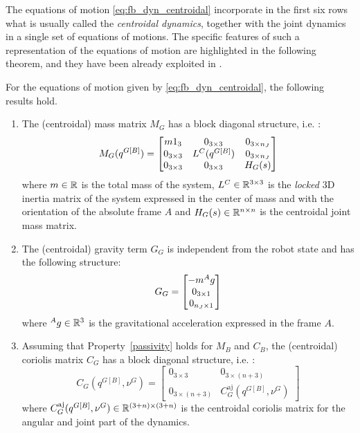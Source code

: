 The equations of motion \eqref{eq:fb_dyn_centroidal} incorporate in the first six rows what is usually called the \emph{centroidal dynamics}, together with the joint dynamics in a single set of equations of motions. 
The specific features of such a representation of the equations of motion are highlighted in the following theorem, and they have been already exploited in \citep{nava2016}. 
\begin{lemma}
\label{lem:centroidalDynamics}
For the equations of motion given by \eqref{eq:fb_dyn_centroidal}, the following results hold.
\begin{enumerate}
\item The (centroidal) mass matrix $M_G$ has a block 
diagonal structure, i.e. :
\begin{equation}
\label{eq:centroidalMassMatrix}
M_G(q^{G[B]}) = 
\begin{bmatrix}
m 1_{3} & 0_{3\times3} & 0_{3\times n_J} \\
0_{3\times3} & L^C(q^{G[B]}) & 0_{3\times n_J} \\
0_{3\times3} & 0_{3\times3} & H_G(s)
\end{bmatrix} 
\end{equation}
where $m \in \mathbb{R}$ is the total mass of the system, $L^C \in \mathbb{R}^{3 \times 3}$ is the \emph{locked} 3D inertia matrix of the system expressed in the center of mass and with the orientation of the absolute frame $A$ and $H_G(s) \in \mathbb{R}^{n \times n}$ is the centroidal joint mass matrix.

\item The (centroidal) gravity term $G_G$ is independent from the robot state and has the following structure: 
\begin{equation}
G_G = 
\begin{bmatrix}
-m \hspace{0em}^Ag \\
0_{3\times1} \\
0_{n_J\times1}
\end{bmatrix}
\end{equation}
where $\hspace{0em}^Ag \in \mathbb{R}^3$ is the gravitational acceleration expressed in the frame $A$.

\item Assuming that Property~\ref{passivity} holds for $M_B$ and $C_B$, the (centroidal) coriolis matrix $C_G$ has a block diagonal structure, i.e. :
\begin{equation}
C_G(q^{G[B]},\nu^G) = 
\begin{bmatrix}
0_{3\times3} & 0_{3 \times (n+3)} \\
0_{3 \times (n+3)} & C^{\text{aj}}_G(q^{G[B]},\nu^G) 
\end{bmatrix}
\end{equation}
where $C^{\text{aj}}_G(q^{G[B]},\nu^G) \in \mathbb{R}^{(3+n)\times(3+n)}$ is the centroidal coriolis matrix for the angular and joint part of the dynamics.
\end{enumerate}
\end{lemma}

